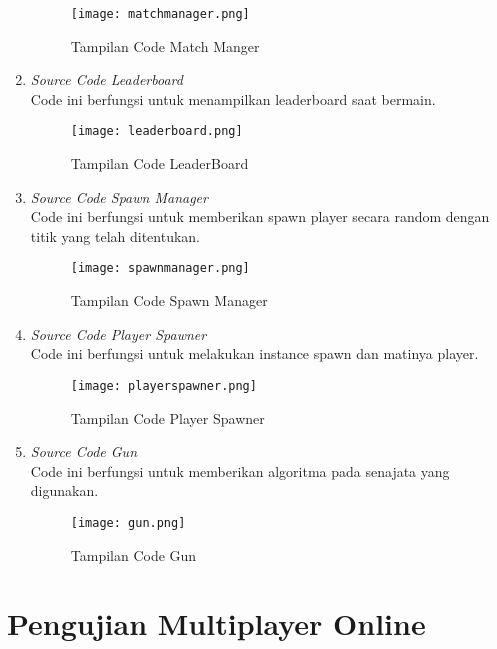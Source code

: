 \begin{enumerate}
    \begin{figure}[h]
        \centering
        \texttt{[image: matchmanager.png]}
        \caption{Tampilan Code Match Manger}
        \label{fig:matchmanager}
    \end{figure}
    \item \textit{Source Code Leaderboard} \\ 
    Code ini berfungsi untuk menampilkan leaderboard saat bermain.
    \begin{figure}[h]
        \centering
        \texttt{[image: leaderboard.png]}
        \caption{Tampilan Code LeaderBoard}
        \label{fig:leaderboard}
    \end{figure}
    \item \textit{Source Code Spawn Manager}\\
    Code ini berfungsi untuk memberikan spawn player secara random dengan titik yang telah ditentukan.
    \begin{figure}[h]
        \centering
        \texttt{[image: spawnmanager.png]}
        \caption{Tampilan Code Spawn Manager}
        \label{fig:spawnmanager}
    \end{figure}
    \item \textit{Source Code Player Spawner} \\ 
    Code ini berfungsi untuk melakukan instance spawn dan matinya player.
    \begin{figure}[h]
        \centering
        \texttt{[image: playerspawner.png]}
        \caption{Tampilan Code Player Spawner}
        \label{fig:playerspawner}
    \end{figure}
    \item \textit{Source Code Gun} \\ 
    Code ini berfungsi untuk memberikan algoritma pada senajata yang digunakan.
    \newpage
    \begin{figure}[h]
        \centering
        \texttt{[image: gun.png]}
        \caption{Tampilan Code Gun}
        \label{fig:gun}
    \end{figure}
\end{enumerate}

\section{Pengujian Multiplayer Online}

